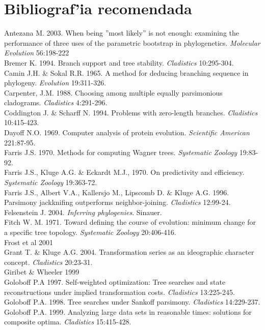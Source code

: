 % 
\renewcommand{\chaptername}{}
\chapter{Bibliograf'ia recomendada}
\noindent
Antezana M. 2003. When being ''most likely'' is not enough: examining the performance of three uses of the parametric bootstrap in phylogenetics. \textit{Molecular Evolution} 56:198-222\\
Bremer K. 1994. Branch support and tree stability. \textit{Cladistics} 10:295-304.\\
Camin J.H. \& Sokal R.R. 1965. A method for deducing branching sequence in phylogeny. \textit{Evolution} 19:311-326.\\
Carpenter, J.M. 1988. Choosing among multiple equally parsimonious cladograms. \textit{Cladistics} 4:291-296.\\
Coddington J. \& Scharff N. 1994. Problems with zero-length branches. \textit{Cladistics} 10:415-423.\\
Dayoff N.O. 1969. Computer analysis of protein evolution. \textit{Scientific American} 221:87-95.\\
Farris J.S. 1970. Methods for computing Wagner trees. \textit{Systematic Zoology} 19:83-92.\\
Farris J.S., Kluge A.G. \& Eckardt M.J., 1970. On predictivity and efficiency. \textit{Systematic Zoology} 19:363-72.\\
Farris J.S., Albert V.A., Kallersjo M., Lipscomb D. \& Kluge A.G. 1996. Parsimony jackknifing outperforms neighbor-joining. \textit{Cladistics} 12:99-24.\\
Felsenstein J. 2004. \textit{Inferring phylogenies}. Sinauer.\\
Fitch W. M. 1971. Toward defining the course of evolution: minimum change for a specific tree topology. \textit{Systematic Zoology} 20:406-416.\\
Frost et al 2001\\
Grant T. \& Kluge A.G. 2004. Transformation series as an ideographic character concept. \textit{Cladistics} 20:23-31.\\
Giribet \& Wheeler 1999 \\
Goloboff P.A 1997. Self-weighted optimization: Tree searches and state reconstructions under implied transformation costs. \textit{Cladistics} 13:225-245.\\
Goloboff P.A. 1998. Tree searches under Sankoff parsimony. \textit{Cladistics} 14:229-237.\\
Goloboff P.A. 1999. Analyzing large data sets in reasonable times: solutions for composite optima. \textit{Cladistics} 15:415-428.\\

